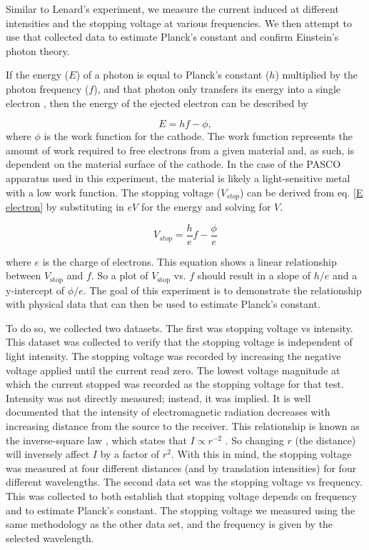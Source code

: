 \documentclass[rc,ec]{physicsinprogress}
\begin{document}
Similar to Lenard's experiment, we measure the current induced at different intensities and the stopping voltage at various frequencies. We then attempt to use that collected data to estimate Planck's constant and confirm Einstein's photon theory.

If the energy ($E$) of a photon is equal to Planck's constant ($h$) multiplied by the photon frequency ($f$), and that photon only transfers its energy into a single electron \cite{Arons1965}, then the energy of the ejected electron can be described by

\begin{equation}
    E=hf - \phi
    \label{E electron},
\end{equation}
where $\phi$ is the work function for the cathode. The work function represents the amount of work required to free electrons from a given material and, as such, is dependent on the material surface of the cathode. In the case of the PASCO apparatus used in this experiment, the material is likely a light-sensitive metal with a low work function.
The stopping voltage ($V_{stop}$) can be derived from eq. \ref{E electron} by substituting in $eV$ for the energy and solving for $V$.   

\begin{equation}
    V_{stop}=\frac{h}{e}f - \frac{\phi}{e}
    \label{Vstop}
\end{equation}

where $e$ is the charge of electrons. This equation shows a linear relationship between $V_{\text{stop}}$ and $f$. So a plot of $V_{\text{stop}}$ vs. $f$ should result in a slope of $h/e$ and a y-intercept of $\phi/e$. The goal of this experiment is to demonstrate the relationship with physical data that can then be used to estimate Planck's constant.



To do so, we collected two datasets. The first was stopping voltage vs intensity. This dataset was collected to verify that the stopping voltage is independent of light intensity. The stopping voltage was recorded by increasing the negative voltage applied until the current read zero. The lowest voltage magnitude at which the current stopped was recorded as the stopping voltage for that test. Intensity was not directly measured; instead, it was implied. It is well documented that the intensity of electromagnetic radiation decreases with increasing distance from the source to the receiver. This relationship is known as the inverse-square law \cite{BROWNSON2014}, which states that $I \propto r^ {-2}$ \cite{Krane19}. So changing $r$ (the distance) will inversely affect $I$ by a factor of $r^2$. With this in mind, the stopping voltage was measured at four different distances (and by translation intensities) for four different wavelengths.
The second data set was the stopping voltage vs frequency. This was collected to both establish that stopping voltage depends on frequency and to estimate Planck's constant. The stopping voltage we measured using the same methodology as the other data set, and the frequency is given by the selected wavelength.
\end{document}
